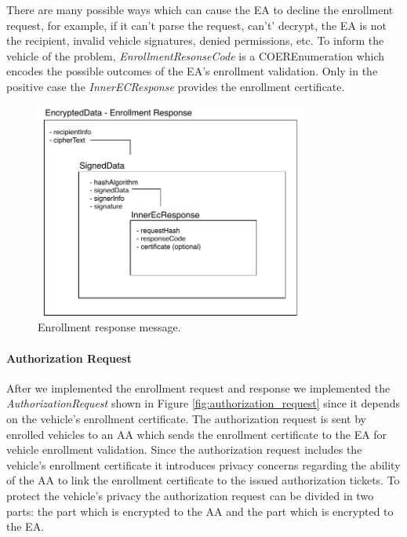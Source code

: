 There are many possible ways which can cause the EA to decline the enrollment request, for example, if it can't parse the request, can't' decrypt, the EA is not the recipient, invalid vehicle signatures, denied permissions, etc. To inform the vehicle of the problem, \textit{EnrollmentResonseCode} is a COEREnumeration which encodes the possible outcomes of the EA's enrollment validation. Only in the positive case the \textit{InnerECResponse} provides the enrollment certificate. 

\begin{figure}[!htb]
	\centering
	\includegraphics[width=0.8\textwidth]{Figures/enrollmentresponse}
	\caption{\label{fig:enrollment_response}Enrollment response message.}
\end{figure}

\paragraph{Authorization Request}
After we implemented the enrollment request and response we implemented the \textit{AuthorizationRequest} shown in Figure \ref{fig:authorization_request} since it depends on the vehicle's enrollment certificate. The authorization request is sent by enrolled vehicles to an AA which sends the enrollment certificate to the EA for vehicle enrollment validation. Since the authorization request includes the vehicle's enrollment certificate it introduces privacy concerns regarding the ability of the AA to link the enrollment certificate to the issued authorization tickets. To protect the vehicle's privacy the authorization request can be divided in two parts: the part which is encrypted to the AA and the part which is encrypted to the EA.

